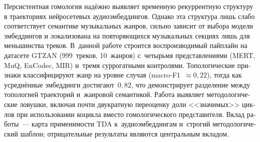 \begin{russian}
Персистентная гомология надёжно выявляет временную рекуррентную структуру в траекториях нейросетевых аудиоэмбеддингов. Однако эта структура лишь слабо соответствует семантике музыкальных жанров, сильно зависит от выбора модели эмбеддингов и локализована на повторяющихся музыкальных секциях лишь для меньшинства треков. В~данной работе строится воспроизводимый пайплайн на датасете GTZAN (999~треков, 10~жанров) с~четырьмя представлениями (MERT, MuQ, EnCodec, MIR) и~тремя суррогатными контролями. Топологические признаки классифицируют жанр на уровне случая (macro-F1~$\approx 0{,}22$), тогда как усреднённые эмбеддинги достигают~$0{,}82$, что демонстрирует разделение между топологией траекторий и~жанровой семантикой. Работа выявляет методологические ловушки, включая почти двукратную переоценку доли <<значимых>> циклов при использовании коцикла вместо гомологического представителя. Вклад работы~--- карта применимости TDA к~аудиоэмбеддингам и~строгий методологический шаблон; отрицательные результаты являются центральным вкладом.
\end{russian}
